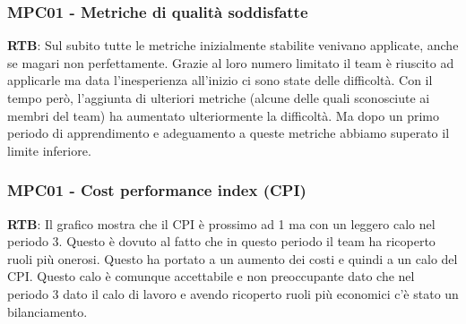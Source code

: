 \documentclass[10pt]{article}
\begin{document}
\begin{justify}
\subsubsection{MPC01 - Metriche di qualità soddisfatte}
\textbf{RTB}: Sul subito tutte le metriche inizialmente stabilite venivano applicate, anche se magari non perfettamente. Grazie al loro numero limitato il team è riuscito ad applicarle ma data l'inesperienza all'inizio ci sono state delle difficoltà. Con il tempo però, l'aggiunta di ulteriori metriche (alcune delle quali sconosciute ai membri del team) ha aumentato ulteriormente la difficoltà. Ma dopo un primo periodo di apprendimento e adeguamento a queste metriche abbiamo superato il limite inferiore.


\subsubsection{MPC01 - Cost performance index (CPI)}
\textbf{RTB}: Il grafico mostra che il CPI è prossimo ad 1 ma con un leggero calo nel periodo 3. Questo è dovuto al fatto che in questo periodo il team ha ricoperto ruoli più onerosi. Questo ha portato a un aumento dei costi e quindi a un calo del CPI. Questo calo è comunque accettabile e non preoccupante dato che nel periodo 3 dato il calo di lavoro e avendo ricoperto ruoli più economici c'è stato un bilanciamento.


\end{justify}
\end{document}
